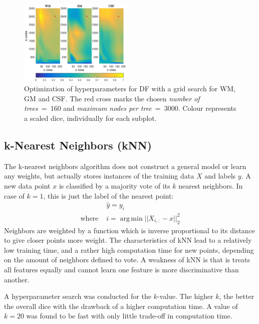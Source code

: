 \documentclass[journal]{IEEEtran}
\DeclareMathOperator*{\argmin}{arg\,min}
\begin{document}
\begin{figure}[h!]
	\centering
	\includegraphics[width=0.48\textwidth]{images/df_grid}
	\caption{Optimization of hyperparameters for DF with a grid search for WM, GM and CSF. The red cross marks the chosen \textit{number of trees}~=~160 and \textit{maximum nodes per tree}~=~3000. Colour represents a scaled dice, individually for each subplot.}\label{f.df_gridsearch}
\end{figure}

\subsection{k-Nearest Neighbors (kNN)}
The k-nearest neighbors algorithm does not construct a general model or learn any weights, but actually stores instances of the training data $X$ and labels $y$. A new data point $x$ is classified by a majority vote of its $k$ nearest neighbors. In case of $k=1$, this is just the label of the nearest point:
\begin{equation}
\begin{split}
& \hat{y} = y_i \\
\text{where } & i = \argmin ||X_{i,:} - x||_2^2
\end{split}
\end{equation}
Neighbors are weighted by a function which is inverse proportional to its distance to give closer points more weight. The characteristics of kNN lead to a relatively low training time, and a rather high computation time for new points, depending on the amount of neighbors defined to vote. A weakness of kNN is that is treats all features equally and cannot learn one feature is more discriminative than another.

A hyperparameter search was conducted for the $k$-value. The higher $k$, the better the overall dice with the drawback of a higher computation time. A value of $k=20$ was found to be fast with only little trade-off in computation time.
\end{document}
